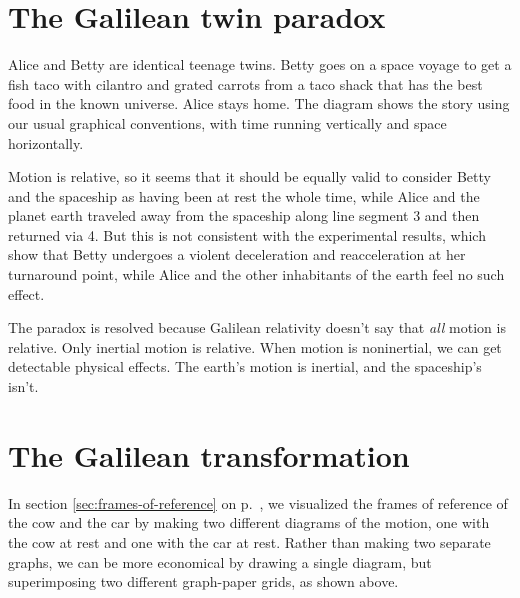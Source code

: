 \section{The Galilean twin paradox}\label{sec:galilean-twin-paradox}

Alice and Betty are identical teenage twins. Betty goes on a space voyage to get a fish taco with
cilantro and grated carrots from a
taco shack that has the best food in the known universe. Alice stays home. The diagram shows the story using our usual
graphical conventions, with time running vertically and space horizontally.

\begin{figure}[h]\label{fig:galilean-twin-paradox}
\end{figure}

Motion is relative, so it seems that it should be equally valid to consider Betty
and the spaceship as having been at rest the whole time, while
Alice and the planet earth traveled away from the spaceship along
line segment 3 and then returned via 4. But this is not consistent with the
experimental results, which show that Betty undergoes a violent
deceleration and reacceleration at her turnaround point, while Alice and the other
inhabitants of the earth feel no such effect.

The paradox is resolved because Galilean relativity doesn't say that \emph{all}
motion is relative. Only inertial motion is relative. When motion is noninertial, we can get detectable
physical effects. The earth's motion is inertial, and the spaceship's isn't.


\pagebreak

\section{The Galilean transformation}

\begin{figure}\label{fig:galilean-transformation}
\end{figure}

In section \ref{sec:frames-of-reference} on p.~\pageref{sec:frames-of-reference}, we visualized the frames of reference
of the cow and the car by making two different diagrams of the motion, one with the cow at rest and one with the car
at rest. Rather than making two separate graphs, we can be more economical by drawing a single diagram,
but superimposing two different graph-paper grids, as shown above.

